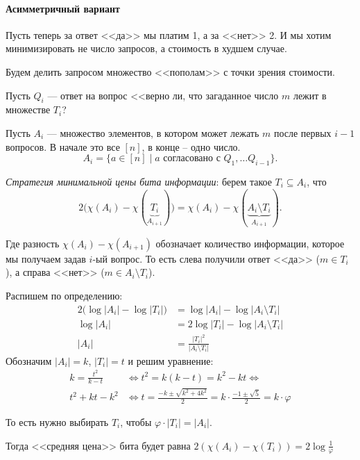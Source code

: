 \paragraph{Асимметричный вариант}
Пусть теперь за ответ <<да>> мы платим 1, а за <<нет>> 2. И мы хотим минимизировать не число запросов, а стоимость в худшем случае.

Будем делить запросом множество <<пополам>> с точки зрения стоимости.

Пусть $ Q_i $ --- ответ на вопрос <<верно ли, что загаданное число $ m$ лежит в множестве $ T_i$?

Пусть $ A_i$ --- множество элементов, в котором может лежать $ m$ после первых  $ i - 1$ вопросов. В начале это все $ [n]$, в конце -- одно число.
\[
	A_i = \{a \in [n] \mid a \text{ согласовано с } Q_1, \ldots Q_{i-1}\}
.\] 

\textit{Стратегия минимальной цены бита информации}: берем такое $ T_i \subseteq A_i$, что
 \[
	 2\bigl(\chi(A_i) - \chi(\underbrace{T_i}_{A_{i+1}})\bigr) = \chi(A_i) - \chi(\underbrace{A_i \setminus T_i}_{A_{i+1}})
.\] 

Где разность $ \chi(A_i) - \chi(A_{i + 1})$ обозначает количество информации, которое мы получаем задав $ i$-ый вопрос. То есть слева получили ответ <<да>> ($ m \in T_i$), а справа <<нет>> ($ m \in A_i \setminus T_i$).

Распишем по определению:
\begin{align*}
	2\bigl(\log \lvert A_i \rvert  - \log \lvert T_i \rvert \bigr) &= \log \lvert A_i \rvert - \log \lvert A_i \setminus T_i \rvert \\
	\log \lvert A_i \rvert &= 2 \log \lvert T_i \rvert - \log \lvert A_i \setminus T_i \rvert \\
	\lvert A_i \rvert  &= \frac{\lvert T_i \rvert^2 }{\lvert A_i \setminus T_i \rvert }
\end{align*}
Обозначим $ \lvert A_i \rvert = k$, $ \lvert T_i \rvert  = t$ и решим уравнение:
\begin{align*}
	k = \frac{t^2}{k-t} & \Longleftrightarrow t^2 = k(k-t) = k^2 -kt \Longleftrightarrow \\
	t^2 + kt - k^2 &\Longleftrightarrow t = \frac{-k \pm \sqrt{ k^2 + 4k^2} }{2} = k \cdot \frac{-1 \pm \sqrt{ 5}}{2}  = k \cdot \varphi 
\end{align*}

То есть нужно выбирать $ T_i$, чтобы $\varphi \cdot \lvert T_i \rvert = \lvert A_i \rvert$. 

Тогда <<средняя цена>> бита будет равна $ 2(\chi(A_i) - \chi(T_i)) = 2 \log \frac{1}{\varphi}$

